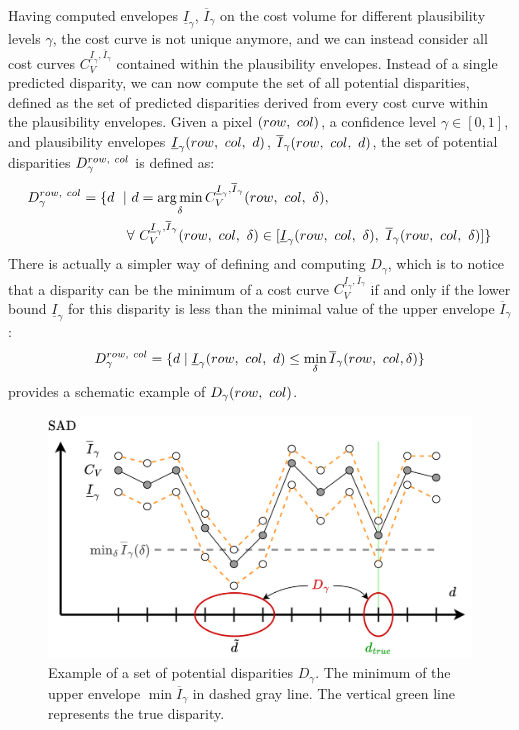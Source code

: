 Having computed envelopes $\underline{I}_\gamma$, $\overline{I}_\gamma$ on the cost volume for different plausibility levels $\gamma$, the cost curve is not unique anymore, and we can instead consider all cost curves $C_V^{\underline{I}_\gamma,\overline{I}_\gamma}$ contained within the plausibility envelopes. Instead of a single predicted disparity, we can now compute the set of all potential disparities, defined as the set of predicted disparities derived from every cost curve within the plausibility envelopes. Given a pixel $(row, ~col)$, a confidence level $\gamma \in [0, 1]$, and plausibility envelopes $\underline{I}_\gamma(row, ~col, ~d)$, $\overline{I}_\gamma(row, ~col, ~d)$, the set of potential disparities $D_\gamma^{row, ~col}$ is defined as:
\begin{align}
    D_\gamma^{row, ~col} = \{d~\mid&~ d=\operatorname*{arg\,min}_\delta C_V^{\underline{I}_\gamma,\overline{I}_\gamma}(row,~col,~\delta),\\
    &\forall ~C_V^{\underline{I}_\gamma,\overline{I}_\gamma}(row, ~col, ~\delta)\in[\underline{I}_\gamma(row, ~col, ~\delta),~ \overline{I}_\gamma(row, ~col, ~\delta)]\}\nonumber
\end{align}
There is actually a simpler way of defining and computing $D_\gamma$, which is to notice that a disparity can be the minimum of a cost curve $C_V^{\underline{I}_\gamma,\overline{I}_\gamma}$ if and only if the lower bound $\underline{I}_\gamma$ for this disparity is less than the minimal value of the upper envelope $\overline{I}_\gamma$ :
\begin{equation}
    D_\gamma^{row, ~col} = \{d \mid \underline{I}_\gamma(row, ~col, ~d) \leq \min_\delta\overline{I}_\gamma(row, ~col, \delta)\}
\end{equation}
 provides a schematic example of $D_\gamma(row, ~col)$.
\begin{figure}[ht]
    \centering
    \includegraphics[width=\linewidth]{Images/Chap_4/Potentiel_disparities.png}
    \caption{Example of a set of potential disparities $D_\gamma$. The minimum of the upper envelope $\min\overline{I}_\gamma$ in dashed gray line. The vertical green line represents the true disparity.}
    \label{fig:potential_disparities}
\end{figure}

